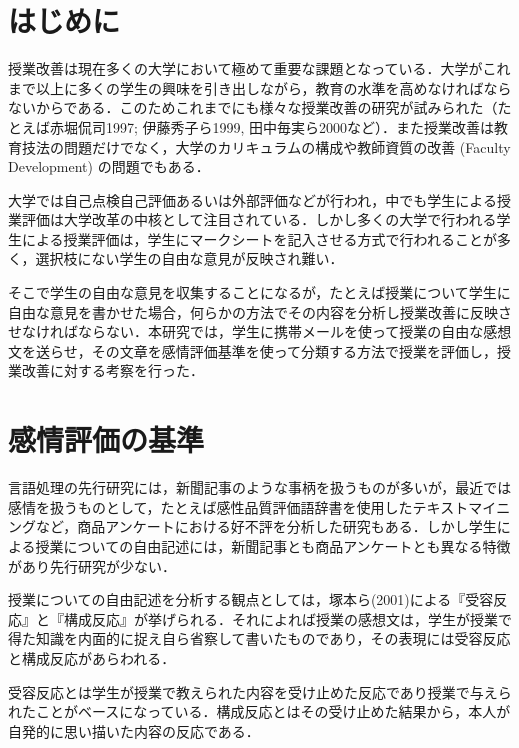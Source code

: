 \documentclass[japanese]{jnlp_1.3a}
\begin{document}
\maketitle


\section{はじめに}

授業改善は現在多くの大学において極めて重要な課題となっている．大学がこれまで以上に多くの学生の興味を引き出しながら，教育の水準を高めなければならないからである．このためこれまでにも様々な授業改善の研究が試みられた（たとえば赤堀侃司1997; 伊藤秀子ら1999, 
田中毎実ら2000など）．また授業改善は教育技法の問題だけでなく，大学のカリキュラムの構成や教師資質の改善 (Faculty Development) の問題でもある．

大学では自己点検自己評価あるいは外部評価などが行われ，中でも学生による授業評価は大学改革の中核として注目されている．しかし多くの大学で行われる学生による授業評価は，学生にマークシートを記入させる方式で行われることが多く，選択枝にない学生の自由な意見が反映され難い．

そこで学生の自由な意見を収集することになるが，たとえば授業について学生に自由な意見を書かせた場合，何らかの方法でその内容を分析し授業改善に反映させなければならない．本研究では，学生に携帯メールを使って授業の自由な感想文を送らせ，その文章を感情評価基準を使って分類する方法で授業を評価し，授業改善に対する考察を行った．

\section{感情評価の基準}

言語処理の先行研究には，新聞記事のような事柄を扱うものが多いが，最近では感情を扱うものとして，たとえば感性品質評価語辞書を使用したテキストマイニングなど，商品アンケートにおける好不評を分析した研究もある．しかし学生による授業についての自由記述には，新聞記事とも商品アンケートとも異なる特徴があり先行研究が少ない．

授業についての自由記述を分析する観点としては，塚本ら(2001)による『受容反応』と『構成反応』が挙げられる．それによれば授業の感想文は，学生が授業で得た知識を内面的に捉え自ら省察して書いたものであり，その表現には受容反応と構成反応があらわれる．

受容反応とは学生が授業で教えられた内容を受け止めた反応であり授業で与えられたことがベースになっている．構成反応とはその受け止めた結果から，本人が自発的に思い描いた内容の反応である．
\end{document}
